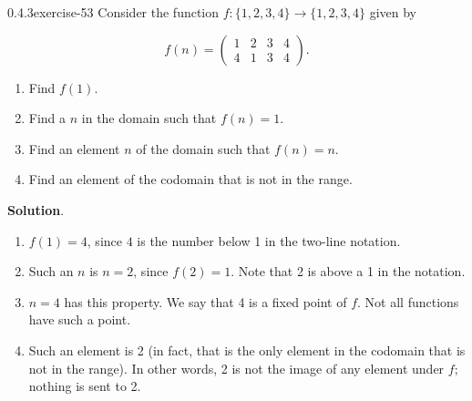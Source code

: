 \documentclass[twoside,11pt,]{book}
\numberwithin{equation}{chapter}
\newcommand{\twoline}[2]{\begin{pmatrix}#1 \\ #2 \end{pmatrix}}
\newcommand{\amp}{&}
\begin{document}
\begin{divisionsolution}{0.4.3}{}{exercise-53}%
\hypertarget{p-923}{}%
Consider the function \(f:\{1,2,3,4\} \to \{1,2,3,4\}\) given by%
\par
\hypertarget{p-924}{}%
%
\begin{equation*}
f(n) = \twoline{1 \amp 2 \amp 3 \amp 4}{4 \amp 1 \amp 3 \amp 4}
\text{.}
\end{equation*}
%
\par
\hypertarget{p-925}{}%
\leavevmode%
\begin{enumerate}[label=(\alph*)]
\item\hypertarget{li-741}{}\hypertarget{p-926}{}%
Find \(f(1)\text{.}\)%
\item\hypertarget{li-742}{}\hypertarget{p-928}{}%
Find a \(n\) in the domain such that \(f(n) = 1\text{.}\)%
\item\hypertarget{li-743}{}\hypertarget{p-930}{}%
Find an element \(n\) of the domain such that \(f(n) = n\text{.}\)%
\item\hypertarget{li-744}{}\hypertarget{p-932}{}%
Find an element of the codomain that is not in the range.%
\end{enumerate}
%
\par\smallskip%
\noindent\textbf{Solution}.\quad%
\hypertarget{p-934}{}%
\leavevmode%
\begin{enumerate}[label=(\alph*)]
\item\hypertarget{li-745}{}\hypertarget{p-935}{}%
\(f(1) = 4\text{,}\) since \(4\) is the number below 1 in the two-line notation.%
\item\hypertarget{li-746}{}\hypertarget{p-936}{}%
Such an \(n\) is \(n= 2\text{,}\) since \(f(2) = 1\text{.}\) Note that 2 is above a 1 in the notation.%
\item\hypertarget{li-747}{}\hypertarget{p-937}{}%
\(n = 4\) has this property. We say that 4 is a fixed point of \(f\text{.}\) Not all functions have such a point.%
\item\hypertarget{li-748}{}\hypertarget{p-938}{}%
Such an element is 2 (in fact, that is the only element in the codomain that is not in the range). In other words, 2 is not the image of any element under \(f\text{;}\) nothing is sent to 2.%
\end{enumerate}
%
\end{divisionsolution}%
\end{document}
